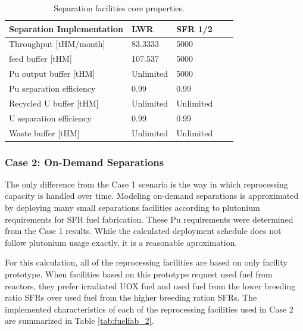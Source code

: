 \documentclass[12pt]{article}
\begin{document}
\begin{table}[h!]
    \centering
    \begin{tabular}{lllll}
    \hline
    Separation Implementation  &  LWR        &  SFR 1/2    \\
    \hline
    Throughput [tHM/month]     &  83.3333    &  5000       \\
    feed buffer [tHM]          &  107.537    &  5000       \\
    Pu output buffer [tHM]     &  Unlimited  &  5000       \\
    Pu separation efficiency   &  0.99       &  0.99       \\
    Recycled U buffer [tHM]    &  Unlimited  &  Unlimited  \\
    U separation efficiency    &  0.99       &  0.99       \\
    Waste buffer [tHM]         &  Unlimited  &  Unlimited  \\
    \hline
    \end{tabular}
    \caption{Separation facilities core properties. }
    \label{tab:separation_1}
\end{table}

\subsubsection{Case 2: On-Demand Separations}
\label{sec:case2}

The only difference from the Case 1 scenario is the way in which reprocessing
capacity is handled over time.  Modeling on-demand separations is approximated by
deploying many small separations facilities according to plutonium requirements
for SFR fuel fabrication.  These Pu requirements were determined from the Case 1
results. While the calculated deployment schedule does not follow plutonium usage
exactly, it is a reasonable aproximation.

For this calculation, all of the reprocessing facilities are based on only
facility prototype.  When facilities based on this prototype request used fuel
from reactors, they prefer irradiated UOX fuel and used fuel from the lower
breeding ratio SFRs over used fuel from the higher breeding ration SFRs.  The
implemented characteristics of each of the reprocessing facilities used in
Case 2 are summarized in Table \ref{tab:fuelfab_2}.
\end{document}
